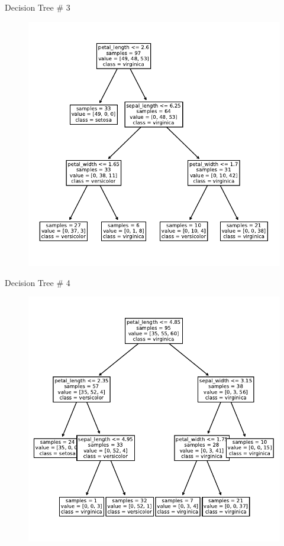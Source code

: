 \documentclass{beamer}
\begin{document}
\begin{frame}{Decision Tree \# 3}
\begin{figure}
\includegraphics[scale=0.7]{tree-3.pdf}
\end{figure}
\end{frame}


\begin{frame}{Decision Tree \# 4}
\begin{figure}
\includegraphics[scale=0.7]{tree-4.pdf}
\end{figure}
\end{frame}
\end{document}
